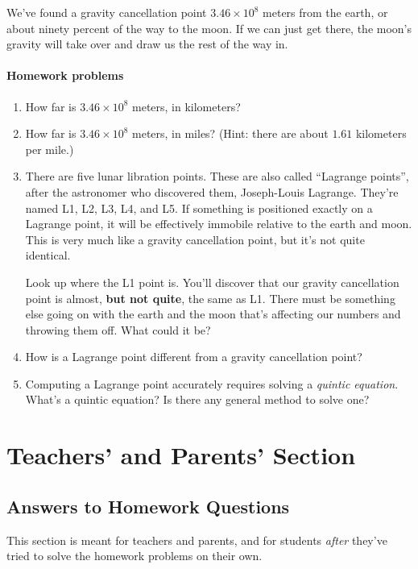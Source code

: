 \documentclass[10pt,letterpaper]{report}
\begin{document}
We've found a gravity cancellation point $3.46 \times 10^8$ meters from the
  earth, or about ninety percent of the way to the moon.  If we can
  just get there, the moon's gravity will take over and draw us the
  rest of the way in.

  \subsection{Homework problems}
  \begin{enumerate}
  \item
    How far is $3.46 \times 10^8$ meters, in kilometers?
  \item
    How far is $3.46 \times 10^8$ meters, in miles?  (Hint: there are
    about $1.61$ kilometers per mile.)
  \item
    There are five lunar libration points.  These are also called
    ``Lagrange points'', after the astronomer who discovered them,
    Joseph-Louis Lagrange.  They're named L1, L2, L3, L4, and L5.  If
    something is positioned exactly on a Lagrange point, it will be
    effectively immobile relative to the earth and moon.  This is very
    much like a gravity cancellation point, but it's not quite identical.

    Look up where the L1 point is.  You'll discover that our gravity
    cancellation point is almost, \textbf{but not quite}, the same as
    L1.
    There must be something
    else going on with the earth and the moon that's affecting our
    numbers and throwing them off.  What could it be?
  \item
    How is a Lagrange point different from a gravity cancellation
    point?
  \item
    Computing a Lagrange point accurately requires solving a
    \textit{quintic equation}.  What's a quintic equation?  Is there
    any general method to solve one?
  \end{enumerate}

  \part{Teachers' and Parents' Section}
  \chapter{Answers to Homework Questions}

  This section is meant for teachers and parents, and for students
  \textit{after} they've tried to solve the homework problems on their
  own.
  
\end{document}
